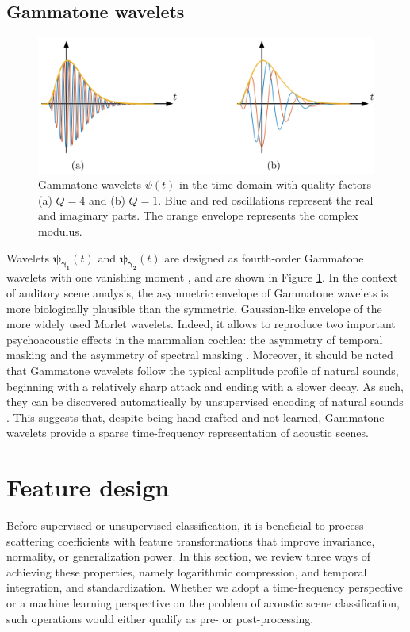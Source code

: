 \documentclass[journal]{IEEEtran}
\begin{document}
\subsection{Gammatone wavelets}
\begin{figure}
\begin{center}
\includegraphics[width=\columnwidth]{gammatones}
\caption{
\label{fig:gammatones}
Gammatone wavelets $\psi(t)$ in the time domain with quality factors (a) $Q = 4$ and (b) $Q = 1$. Blue and red oscillations represent the real and imaginary parts. The orange envelope represents the complex modulus.}
\end{center}
\end{figure}
Wavelets
$\boldsymbol{\psi_{\gamma_1}}(t)$ and $\boldsymbol{\psi_{\gamma_2}}(t)$ are designed as fourth-order Gammatone
wavelets with one vanishing moment \cite{Venkitaraman2014}, and are shown in Figure \ref{fig:gammatones}.
In the context of auditory scene analysis, the asymmetric envelope of Gammatone wavelets is more biologically plausible than the symmetric, Gaussian-like envelope of the more widely used Morlet wavelets.
Indeed, it allows to reproduce two important psychoacoustic effects in the mammalian cochlea: the asymmetry of temporal masking and the asymmetry of spectral masking  \cite{Fastl2007}.
Moreover, it should be noted that Gammatone wavelets follow the typical amplitude profile of natural sounds, beginning with a relatively sharp attack and ending with a slower decay.
As such, they can be discovered automatically by unsupervised encoding of natural sounds \cite{Smith2006}.
This suggests that, despite being hand-crafted and not learned, Gammatone wavelets provide a sparse time-frequency representation of acoustic scenes.

\section{Feature design}
\label{sec:design}

Before supervised or unsupervised classification, it is beneficial to process scattering coefficients with feature transformations that improve invariance, normality, or generalization power.
In this section, we review three ways of achieving these properties, namely logarithmic compression, and temporal integration, and standardization.
Whether we adopt a time-frequency perspective or a machine learning perspective on the problem of acoustic scene classification, such operations would either qualify as pre- or post-processing.
\end{document}
